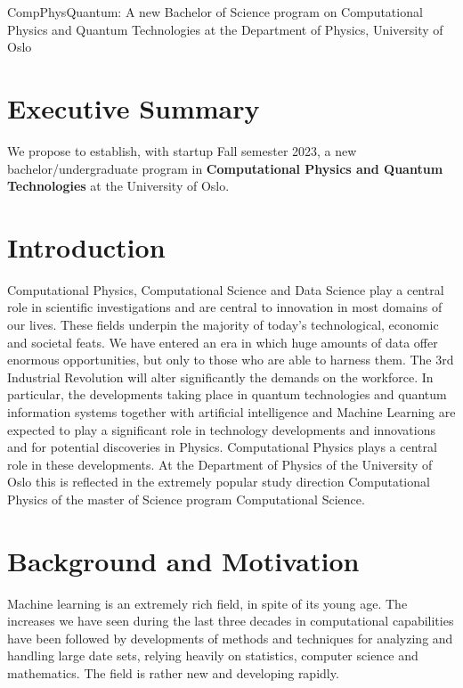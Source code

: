 \documentclass[oneside,final,10pt]{article}
\begin{document}
\thispagestyle{empty}

\begin{center}
{\LARGE\bf
\begin{spacing}{1.25}
CompPhysQuantum: A new Bachelor of Science program on Computational Physics and Quantum Technologies  at the Department of Physics, University of Oslo
\end{spacing}
}
\end{center}



\vspace{1cm}


\section*{Executive Summary}

We propose to establish, with startup Fall semester 2023, a new bachelor/undergraduate program in {\bf Computational Physics and Quantum Technologies}  at the University of Oslo. 

\section*{Introduction}

Computational Physics, Computational Science  and Data Science play a central role in scientific investigations and are central to innovation in most domains of our lives. These fields underpin the majority of today's technological, economic and societal feats. We have entered an era in which huge amounts of data offer enormous opportunities, but only to those who are able to harness them. The 3rd Industrial Revolution will alter significantly the demands on the workforce. In particular, the developments taking place in quantum technologies and quantum information systems together with artificial intelligence and Machine Learning are expected to play a significant role in technology developments and innovations and for potential discoveries in Physics.
Computational Physics plays a central role in these developments. At the Department of Physics of the University of Oslo this is reflected in the extremely popular study direction Computational Physics of the master of Science program Computational Science. 

\section{Background and Motivation}
Machine learning  is an extremely rich field, in spite of its young age. The
increases we have seen during the last three decades in computational
capabilities have been followed by developments of methods and
techniques for analyzing and handling large date sets, relying heavily
on statistics, computer science and mathematics.  The field is rather
new and developing rapidly. 
\end{document}

